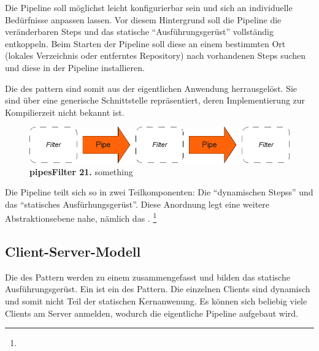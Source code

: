 Die Pipeline soll möglichst leicht konfigurierbar sein und sich an
individuelle Bedürfnisse anpassen lassen.
Vor diesem Hintergrund soll die Pipeline die veränderbaren Steps und das
statische \enquote{Ausführungsgerüst} vollständig entkoppeln. Beim Starten der
Pipeline soll diese an einem bestimmten Ort (lokales Verzeichnis oder
entferntes Repository) nach vorhandenen Steps suchen und diese in der Pipeline
installieren.

Die  des  pattern sind somit aus der
eigentlichen Anwendung herrausgelöst. Sie sind über eine generische
Schnittstelle repräsentiert, deren Implementierung zur Kompilierzeit nicht
bekannt ist.

\begin{figure}[htbp]
	\begin{center}
		\includegraphics[scale=0.7]{pics/pipesFilter21.png}
	\caption[Pipes and Filter 21]{
	\textbf{pipesFilter 21.}
	something}
	\end{center}
	\label{fig:pipesFilter21}
\end{figure}

Die Pipeline teilt sich so in zwei Teilkomponenten:
Die \enquote{dynamischen Stepss} und das \enquote{statisches Ausfürhungsgerüst}.
Diese Anordnung legt eine weitere Abstraktionsebene nahe, nämlich das
.
\footnote{}

\subsection{Client-Server-Modell}
Die  des  Pattern werden zu einem
 zusammengefasst und bilden das {statische Ausführungsgerüst}.
Ein  ist ein  des  Pattern.
Die einzelnen Clients sind dynamisch und somit nicht Teil der
statischen Kernanwenung.
Es können sich beliebig viele Clients am Server anmelden, wodurch die
eigentliche Pipeline aufgebaut wird.

